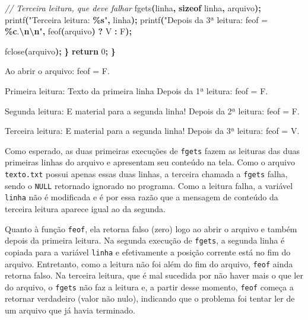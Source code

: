 \documentclass[
  11pt,
  a4paper,
]{scrbook}
\newenvironment{Shaded}{\begin{snugshade}}{\end{snugshade}}
\newcommand{\CharTok}[1]{\textcolor[rgb]{0.31,0.60,0.02}{#1}}
\newcommand{\CommentTok}[1]{\textcolor[rgb]{0.56,0.35,0.01}{\textit{#1}}}
\newcommand{\ControlFlowTok}[1]{\textcolor[rgb]{0.13,0.29,0.53}{\textbf{#1}}}
\newcommand{\DecValTok}[1]{\textcolor[rgb]{0.00,0.00,0.81}{#1}}
\newcommand{\KeywordTok}[1]{\textcolor[rgb]{0.13,0.29,0.53}{\textbf{#1}}}
\newcommand{\NormalTok}[1]{#1}
\newcommand{\OperatorTok}[1]{\textcolor[rgb]{0.81,0.36,0.00}{\textbf{#1}}}
\newcommand{\SpecialCharTok}[1]{\textcolor[rgb]{0.81,0.36,0.00}{\textbf{#1}}}
\newcommand{\StringTok}[1]{\textcolor[rgb]{0.31,0.60,0.02}{#1}}
\begin{document}
\begin{Shaded}
\begin{Highlighting}[]
        \CommentTok{// Terceira leitura, que deve falhar}
\NormalTok{        fgets}\OperatorTok{(}\NormalTok{linha}\OperatorTok{,} \KeywordTok{sizeof}\NormalTok{ linha}\OperatorTok{,}\NormalTok{ arquivo}\OperatorTok{);}
\NormalTok{        printf}\OperatorTok{(}\StringTok{"Terceira leitura: }\SpecialCharTok{\%s}\StringTok{"}\OperatorTok{,}\NormalTok{ linha}\OperatorTok{);}
\NormalTok{        printf}\OperatorTok{(}\StringTok{"Depois da 3ª leitura: feof = }\SpecialCharTok{\%c}\StringTok{.}\SpecialCharTok{\textbackslash{}n\textbackslash{}n}\StringTok{"}\OperatorTok{,}
\NormalTok{               feof}\OperatorTok{(}\NormalTok{arquivo}\OperatorTok{)} \OperatorTok{?} \CharTok{\textquotesingle{}V\textquotesingle{}} \OperatorTok{:} \CharTok{\textquotesingle{}F\textquotesingle{}}\OperatorTok{);}

\NormalTok{        fclose}\OperatorTok{(}\NormalTok{arquivo}\OperatorTok{);}
    \OperatorTok{\}}
    \ControlFlowTok{return} \DecValTok{0}\OperatorTok{;}
\OperatorTok{\}}
\end{Highlighting}
\end{Shaded}

\begin{Shaded}
\begin{Highlighting}[]
\NormalTok{Ao abrir o arquivo: feof = F.}

\NormalTok{Primeira leitura: Texto da primeira linha}
\NormalTok{Depois da 1ª leitura: feof = F.}

\NormalTok{Segunda leitura: E material para a segunda linha!}
\NormalTok{Depois da 2ª leitura: feof = F.}

\NormalTok{Terceira leitura: E material para a segunda linha!}
\NormalTok{Depois da 3ª leitura: feof = V.}
\end{Highlighting}
\end{Shaded}

Como esperado, as duas primeiras execuções de \texttt{fgets} fazem as
leituras das duas primeiras linhas do arquivo e apresentam seu conteúdo
na tela. Como o arquivo \texttt{texto.txt} possui apenas essas duas
linhas, a terceira chamada a \texttt{fgets} falha, sendo o \texttt{NULL}
retornado ignorado no programa. Como a leitura falha, a variável
\texttt{linha} não é modificada e é por essa razão que a mensagem de
conteúdo da terceira leitura aparece igual ao da segunda.

Quanto à função \texttt{feof}, ela retorna falso (zero) logo ao abrir o
arquivo e também depois da primeira leitura. Na segunda execução de
\texttt{fgets}, a segunda linha é copiada para a variável \texttt{linha}
e efetivamente a posição corrente está no fim do arquivo. Entretanto,
como a leitura não foi além do fim do arquivo, \texttt{feof} ainda
retorna falso. Na terceira leitura, que é mal sucedida por não haver
mais o que ler do arquivo, o \texttt{fgets} não faz a leitura e, a
partir desse momento, \texttt{feof} começa a retornar verdadeiro (valor
não nulo), indicando que o problema foi tentar ler de um arquivo que já
havia terminado.
\end{document}
